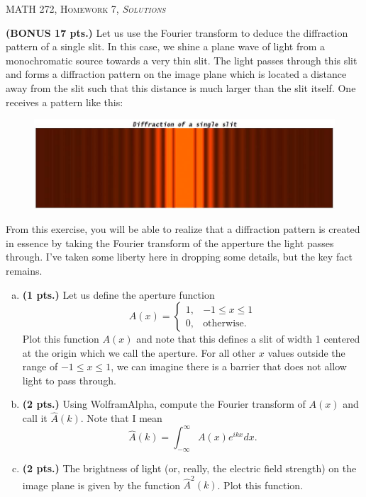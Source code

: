 \documentclass[12pt]{article} %
\begin{document}
\begin{center}
   \textsc{\large MATH 272, Homework 7, \emph{Solutions}}\\
\end{center}
\vspace{.5cm}

\begin{problem}
\textbf{(BONUS 17 pts.)} Let us use the Fourier transform to deduce the diffraction pattern of a single slit. In this case, we shine a plane wave of light from a monochromatic source towards a very thin slit. The light passes through this slit and forms a diffraction pattern on the image plane which is located a distance away from the slit such that this distance is much larger than the slit itself. One receives a pattern like this:
\begin{figure}[H]
    \centering
    \includegraphics[width=.6\textwidth]{single_slit.jpg}
\end{figure}
From this exercise, you will be able to realize that a diffraction pattern is created in essence by taking the Fourier transform of the apperture the light passes through. I've taken some liberty here in dropping some details, but the key fact remains.
\begin{enumerate}[(a)]
    \item \textbf{(1 pts.)} Let us define the aperture function
    \[
    A(x) = \begin{cases} 1, & -1 \leq x \leq 1\\
    0, &\textrm{otherwise}.
    \end{cases}
    \]
    Plot this function $A(x)$ and note that this defines a slit of width 1 centered at the origin which we call the aperture. For all other $x$ values outside the range of $-1 \leq x \leq 1$, we can imagine there is a barrier that does not allow light to pass through.
    \item \textbf{(2 pts.)} Using WolframAlpha, compute the Fourier transform of $A(x)$ and call it $\hat{A}(k)$. Note that I mean
	\[
	\hat{A}(k) = \int_{-\infty}^\infty A(x) e^{ikx}dx.
	\]
    \item \textbf{(2 pts.)} The brightness of light (or, really, the electric field strength) on the image plane is given by the function $\hat{A}^2(k)$. Plot this function. %

\end{enumerate}
\end{problem}
\end{document}
